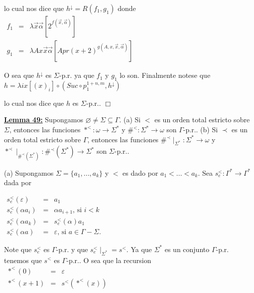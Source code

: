 lo cual nos dice que \(h^{\downarrow }=R(f_{1},g_{1})\) donde
\(\displaystyle \begin{array}{rcl} f_{1} & =& \lambda \vec{x}\vec{\alpha}\left[ 2^{f(\vec{x},\vec{\alpha})}\right] \\ g_{1} & =& \lambda Ax\vec{x}\vec{\alpha}\left[ Apr(x+2)^{g(A,x,\vec{x},\vec{ \alpha})}\right] \end{array} \)

O sea que \(h^{\downarrow }\) es \(\Sigma \)-p.r. ya que \(f_{1}\) y \(g_{1}\) lo son. Finalmente notese que
\(\displaystyle h=\lambda ix[(x)_{i}]\circ (Suc\circ p_{1}^{1+n,m},h^{\downarrow }) \)

lo cual nos dice que \(h\) es \(\Sigma \)-p.r.. \(\Box\)


\textbf{\underline{Lemma 49:}} Supongamos \(\varnothing \neq \Sigma \subseteq \Gamma \).
(a) Si \(< \) es un orden total estricto sobre \(\Sigma \), entonces las funciones \(\ast ^{< }:\omega \rightarrow \Sigma ^{\ast }\) y \(\#^{< }:\Sigma ^{\ast }\rightarrow \omega \) son \(\Gamma \)-p.r..
(b) Si \(\prec \) es un orden total estricto sobre \(\Gamma \), entonces las funciones \(\#^{\prec }\mid _{\Sigma ^{\ast }}:\Sigma ^{\ast }\rightarrow \omega \) y \(\ast ^{\prec }\mid _{\#^{\prec }(\Sigma ^{\ast })}:\#^{\prec }(\Sigma ^{\ast })\rightarrow \Sigma ^{\ast }\) son \(\Sigma \)-p.r..

\PROOF (a) Supongamos \(\Sigma =\{a_{1},...,a_{k}\}\) y \(< \) es dado por \( a_{1}< ...< a_{k}\). Sea \(s_{e}^{< }:\Gamma ^{\ast }\rightarrow \Gamma ^{\ast }\) dada por

\(\displaystyle \begin{array}{rcl} s_{e}^{< }(\varepsilon ) & =& a_{1} \\ s_{e}^{< }(\alpha a_{i}) & =& \alpha a_{i+1}\text{, si }i< k \\ s_{e}^{< }(\alpha a_{k}) & =& s_{e}^{< }(\alpha )a_{1} \\ s_{e}^{< }(\alpha a) & =& \varepsilon \text{, si }a\in \Gamma -\Sigma . \end{array} \)

Note que \(s_{e}^{< }\) es \(\Gamma \)-p.r. y que \(s_{e}^{< }\mid _{\Sigma ^{\ast }}=s^{< }\). Ya que \(\Sigma ^{\ast }\) es un conjunto \(\Gamma \)-p.r. tenemos que \(s^{< }\) es \(\Gamma \)-p.r.. O sea que la recursion
\(\displaystyle \begin{array}{rcl} \ast ^{< }(0) & =& \varepsilon \\ \ast ^{< }(x+1) & =& s^{< }(\ast ^{< }(x)) \end{array} \)

